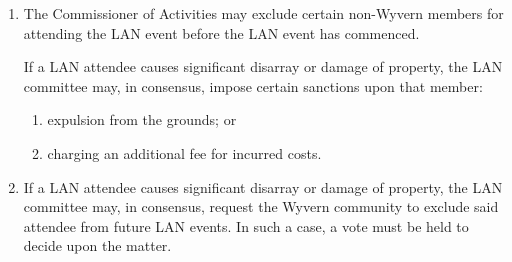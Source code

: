 \begin{enumerate}
    \item The Commissioner of Activities may exclude certain non-Wyvern members for attending the LAN event before the LAN event has commenced.
    
    \begin{item} If a LAN attendee causes significant disarray or damage of property, the LAN committee may, in consensus, impose certain sanctions upon that member:
        \begin{enumerate}
            \item expulsion from the grounds; or
            \item charging an additional fee for incurred costs.
        \end{enumerate}
    \end{item}
    
    \item If a LAN attendee causes significant disarray or damage of property, the LAN committee may, in consensus, request the Wyvern community to exclude said attendee from future LAN events. In such a case, a vote must be held to decide upon the matter.

\end{enumerate}
\newpage